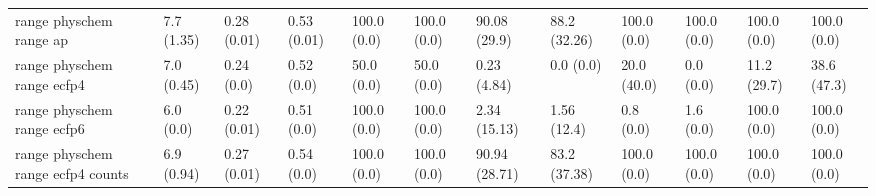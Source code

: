 \begin{tabular}{llllllllllll}
range physchem range ap & {\cellcolor[HTML]{ECF8FB}} \color[HTML]{000000} 7.7 (1.35) & {\cellcolor[HTML]{F1FAFC}} \color[HTML]{000000} 0.28 (0.01) & {\cellcolor[HTML]{5DBD99}} \color[HTML]{000000} 0.53 (0.01) & {\cellcolor[HTML]{F7FCFD}} \color[HTML]{000000} 100.0 (0.0) & {\cellcolor[HTML]{F7FCFD}} \color[HTML]{000000} 100.0 (0.0) & {\cellcolor[HTML]{006428}} \color[HTML]{F1F1F1} 90.08 (29.9) & {\cellcolor[HTML]{006B2B}} \color[HTML]{F1F1F1} 88.2 (32.26) & {\cellcolor[HTML]{00441B}} \color[HTML]{F1F1F1} 100.0 (0.0) & {\cellcolor[HTML]{00441B}} \color[HTML]{F1F1F1} 100.0 (0.0) & {\cellcolor[HTML]{00441B}} \color[HTML]{F1F1F1} 100.0 (0.0) & {\cellcolor[HTML]{00441B}} \color[HTML]{F1F1F1} 100.0 (0.0) \\
range physchem range ecfp4 & {\cellcolor[HTML]{EDF8FB}} \color[HTML]{000000} 7.0 (0.45) & {\cellcolor[HTML]{F7FCFD}} \color[HTML]{000000} 0.24 (0.0) & {\cellcolor[HTML]{60BF9C}} \color[HTML]{000000} 0.52 (0.0) & {\cellcolor[HTML]{F7FCFD}} \color[HTML]{000000} 50.0 (0.0) & {\cellcolor[HTML]{F7FCFD}} \color[HTML]{000000} 50.0 (0.0) & {\cellcolor[HTML]{F7FCFD}} \color[HTML]{000000} 0.23 (4.84) & {\cellcolor[HTML]{F7FCFD}} \color[HTML]{000000} 0.0 (0.0) & {\cellcolor[HTML]{00441B}} \color[HTML]{F1F1F1} 20.0 (40.0) & {\cellcolor[HTML]{00441B}} \color[HTML]{F1F1F1} 0.0 (0.0) & {\cellcolor[HTML]{00441B}} \color[HTML]{F1F1F1} 11.2 (29.7) & {\cellcolor[HTML]{00441B}} \color[HTML]{F1F1F1} 38.6 (47.3) \\
range physchem range ecfp6 & {\cellcolor[HTML]{EFF9FB}} \color[HTML]{000000} 6.0 (0.0) & {\cellcolor[HTML]{F7FCFD}} \color[HTML]{000000} 0.22 (0.01) & {\cellcolor[HTML]{62C09F}} \color[HTML]{000000} 0.51 (0.0) & {\cellcolor[HTML]{F7FCFD}} \color[HTML]{000000} 100.0 (0.0) & {\cellcolor[HTML]{F7FCFD}} \color[HTML]{000000} 100.0 (0.0) & {\cellcolor[HTML]{F4FBFC}} \color[HTML]{000000} 2.34 (15.13) & {\cellcolor[HTML]{F5FBFC}} \color[HTML]{000000} 1.56 (12.4) & {\cellcolor[HTML]{00441B}} \color[HTML]{F1F1F1} 0.8 (0.0) & {\cellcolor[HTML]{00441B}} \color[HTML]{F1F1F1} 1.6 (0.0) & {\cellcolor[HTML]{00441B}} \color[HTML]{F1F1F1} 100.0 (0.0) & {\cellcolor[HTML]{00441B}} \color[HTML]{F1F1F1} 100.0 (0.0) \\
range physchem range ecfp4 counts & {\cellcolor[HTML]{EDF8FB}} \color[HTML]{000000} 6.9 (0.94) & {\cellcolor[HTML]{F7FCFD}} \color[HTML]{000000} 0.27 (0.01) & {\cellcolor[HTML]{5ABB95}} \color[HTML]{F1F1F1} 0.54 (0.0) & {\cellcolor[HTML]{F7FCFD}} \color[HTML]{000000} 100.0 (0.0) & {\cellcolor[HTML]{F7FCFD}} \color[HTML]{000000} 100.0 (0.0) & {\cellcolor[HTML]{006227}} \color[HTML]{F1F1F1} 90.94 (28.71) & {\cellcolor[HTML]{0B7734}} \color[HTML]{F1F1F1} 83.2 (37.38) & {\cellcolor[HTML]{00441B}} \color[HTML]{F1F1F1} 100.0 (0.0) & {\cellcolor[HTML]{00441B}} \color[HTML]{F1F1F1} 100.0 (0.0) & {\cellcolor[HTML]{00441B}} \color[HTML]{F1F1F1} 100.0 (0.0) & {\cellcolor[HTML]{00441B}} \color[HTML]{F1F1F1} 100.0 (0.0) \\

\end{tabular}
